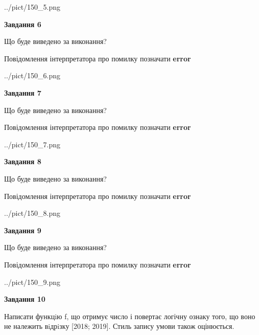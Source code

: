 \documentclass[12pt, ukrainian]{article}
\begin{document}
{\begin {large}
\begin{center}
	{../pict/150_5.png}
\end{center}
\newpage

{\begin {center}\textbf{Завдання 6}\end {center}}\par
Що буде виведено за виконання? \par
Повідомлення інтерпретатора про помилку позначати \textbf{error}

\begin{center}
	{../pict/150_6.png}
\end{center}
\newpage

{\begin {center}\textbf{Завдання 7}\end {center}}\par
Що буде виведено за виконання? \par
Повідомлення інтерпретатора про помилку позначати \textbf{error}

\begin{center}
	{../pict/150_7.png}
\end{center}
\newpage

{\begin {center}\textbf{Завдання 8}\end {center}}\par
Що буде виведено за виконання? \par
Повідомлення інтерпретатора про помилку позначати \textbf{error}

\begin{center}
	{../pict/150_8.png}
\end{center}
\newpage

{\begin {center}\textbf{Завдання 9}\end {center}}\par
Що буде виведено за виконання? \par
Повідомлення інтерпретатора про помилку позначати \textbf{error}

\begin{center}
	{../pict/150_9.png}
\end{center}
\newpage

{\begin {center}\textbf{Завдання 10}\end {center}}\par

Написати функцiю f, що отримує число і повертає логічну ознаку того, що воно не належить вiдрiзку [2018; 2019]. Стиль запису умови також оцінюється.\par
\newpage

\end {large}}
\end{document}
